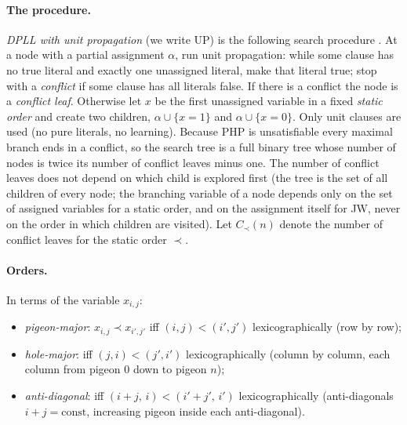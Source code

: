 \documentclass[11pt]{article}
\theoremstyle{definition}
\theoremstyle{remark}
\newcommand{\PHP}{\mathrm{PHP}}
\newcommand{\UP}{\mathrm{UP}}
\begin{document}
\paragraph{The procedure.}
\emph{DPLL with unit propagation} (we write $\UP$) is the following search procedure
\cite{DP60,DLL62}. At a node with a partial assignment $\alpha$, run unit propagation: while some
clause has no true literal and exactly one unassigned literal, make that literal true; stop with a
\emph{conflict} if some clause has all literals false. If there is a conflict the node is a
\emph{conflict leaf}. Otherwise let $x$ be the first unassigned variable in a fixed \emph{static
order} and create two children, $\alpha\cup\{x{=}1\}$ and $\alpha\cup\{x{=}0\}$. Only unit clauses
are used (no pure literals, no learning). Because $\PHP$ is unsatisfiable every maximal branch ends
in a conflict, so the search tree is a full binary tree whose number of nodes is twice its number of
conflict leaves minus one. The number of conflict leaves does not depend on which child is explored
first (the tree is the set of all children of every node; the branching variable of a node depends only on the set of assigned variables for a static order, and on the assignment itself for JW, never on the order in which children are visited). Let $C_\prec(n)$ denote the number of conflict leaves for the static order $\prec$.

\paragraph{Orders.} In terms of the variable $x_{i,j}$:
\begin{itemize}
\item \emph{pigeon-major}: $x_{i,j}\prec x_{i',j'}$ iff $(i,j)<(i',j')$ lexicographically
  (row by row);
\item \emph{hole-major}: iff $(j,i)<(j',i')$ lexicographically (column by column, each column from
  pigeon $0$ down to pigeon $n$);
\item \emph{anti-diagonal}: iff $(i+j,\,i)<(i'+j',\,i')$ lexicographically (anti-diagonals
  $i+j=\text{const}$, increasing pigeon inside each anti-diagonal).
\end{itemize}
\end{document}
